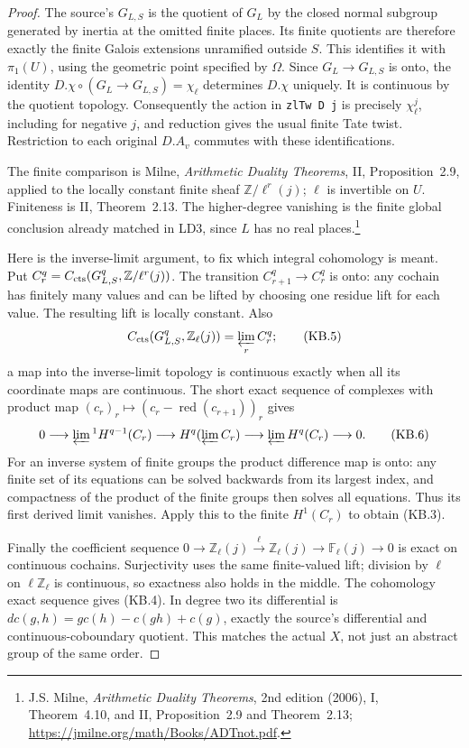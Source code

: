 \begin{proof}
The source's $G_{L,S}$ is the quotient of $G_L$ by the closed normal
subgroup generated by inertia at the omitted finite places.  Its
finite quotients are therefore exactly the finite Galois extensions
unramified outside $S$.  This identifies it with $\pi_1(U)$, using
the geometric point specified by $\Omega$.  Since $G_L\to G_{L,S}$
is onto, the identity $D.\chi\circ(G_L\to G_{L,S})=\chi_\ell$
determines $D.\chi$ uniquely.  It is continuous by the quotient
topology.  Consequently the action in \texttt{zlTw D j} is precisely
$\chi_\ell^j$, including for negative $j$, and reduction gives the
usual finite Tate twist.  Restriction to each original $D.A_v$
commutes with these identifications.

The finite comparison is Milne, \emph{Arithmetic Duality Theorems},
II, Proposition~2.9, applied to the locally constant finite sheaf
$\mathbb Z/\ell^r(j)$; $\ell$ is invertible on $U$.
Finiteness is II, Theorem~2.13.  The higher-degree vanishing is the
finite global conclusion already matched in LD3, since $L$ has no
real places.\footnote{J.S. Milne, \emph{Arithmetic Duality Theorems},
2nd edition (2006), I, Theorem~4.10, and II, Proposition~2.9 and
Theorem~2.13; \url{https://jmilne.org/math/Books/ADTnot.pdf}.}

Here is the inverse-limit argument, to fix which integral cohomology
is meant.  Put $C_r^q=C_{\rm cts}(G_{L,S}^q,\mathbb Z/\ell^r(j))$.
The transition $C_{r+1}^q\to C_r^q$ is onto: any cochain has finitely
many values and can be lifted by choosing one residue lift for each
value.  The resulting lift is locally constant.  Also
\[
 C_{\rm cts}(G_{L,S}^q,\mathbb Z_\ell(j))=\varprojlim_r C_r^q;
 \tag{KB.5}
\]
a map into the inverse-limit topology is continuous exactly when
all its coordinate maps are continuous.  The short exact sequence
of complexes with product map
$(c_r)_r\mapsto(c_r-\operatorname{red}(c_{r+1}))_r$ gives
\[
 0\longrightarrow\varprojlim{}^1 H^{q-1}(C_r)
 \longrightarrow H^q(\varprojlim C_r)
 \longrightarrow\varprojlim H^q(C_r)\longrightarrow0.
 \tag{KB.6}
\]
For an inverse system of finite groups the product difference map
is onto: any finite set of its equations can be solved backwards
from its largest index, and compactness of the product of the finite
groups then solves all equations.  Thus its first derived limit
vanishes.  Apply this to the finite $H^1(C_r)$ to obtain (KB.3).

Finally the coefficient sequence
$0\to\mathbb Z_\ell(j)\xrightarrow{\ell}\mathbb Z_\ell(j)
\to\mathbb F_\ell(j)\to0$ is exact on continuous cochains.
Surjectivity uses the same finite-valued lift; division by $\ell$
on $\ell\mathbb Z_\ell$ is continuous, so exactness also holds in
the middle.  The cohomology exact sequence gives (KB.4).
In degree two its differential is
$dc(g,h)=g c(h)-c(gh)+c(g)$, exactly the source's differential and
continuous-coboundary quotient.  This matches the actual $X$, not
just an abstract group of the same order.
\end{proof}

